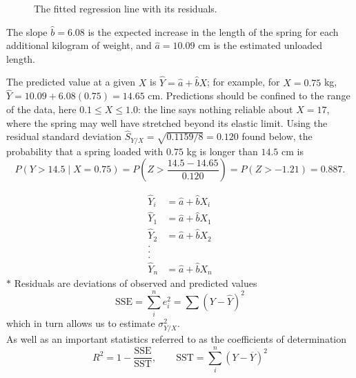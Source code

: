 \documentclass[11pt,a4paper]{article}
\theoremstyle{definition}
\begin{document}
\begin{figure}[H]
\centering
{}
\caption{The fitted regression line with its residuals.}
\end{figure}

The slope $\hat{b}=6.08$ is the expected increase in the length of the spring for each
additional kilogram of weight, and $\hat a = 10.09$ cm is the estimated unloaded length.

The predicted value at a given $X$ is $\hat{Y}=\hat{a}+\hat{b}X$; for example, for $X = 0.75$ kg,
$\hat Y = 10.09 + 6.08(0.75) = 14.65$ cm. Predictions should be confined to the range of the
data, here $0.1\leq X\leq 1.0$: the line says nothing reliable about $X = 17$, where the spring
may well have stretched beyond its elastic limit. Using the residual standard deviation
$\hat S_{Y/X} = \sqrt{0.1159/8} = 0.120$ found below, the probability that a spring loaded with
$0.75$ kg is longer than $14.5$ cm is
\[P(Y>14.5\mid X = 0.75) = P\left(Z>\frac{14.5 - 14.65}{0.120}\right) = P(Z>-1.21) = 0.887 .\]
 
 \begin{align*}
 \hat{Y}_i &=\hat{a}+\hat{b}X_i\\[1ex]
 \hat{Y}_1 &=\hat{a}+\hat{b}X_1\\
 \hat{Y}_2 &=\hat{a}+\hat{b}X_2\\
 .\\
 .\\
 .\\
 \hat{Y}_n &=\hat{a}+\hat{b}X_n
\end{align*}
$*$ Residuals are deviations of observed and predicted values \[\text{SSE}=\sum_i^ne_i^2=\sum (Y-\hat{Y})^2\]
which in turn allows us to estimate $\sigma^2_{Y/X}$.\\[1ex]
As well as an important statistics referred to as the coefficients of determination
\[R^2=1-\frac{\text{SSE}}{\text{SST}},\qquad  \text{SST}=\sum^n_i(Y-\overline{Y})^2\]\\
\end{document}

